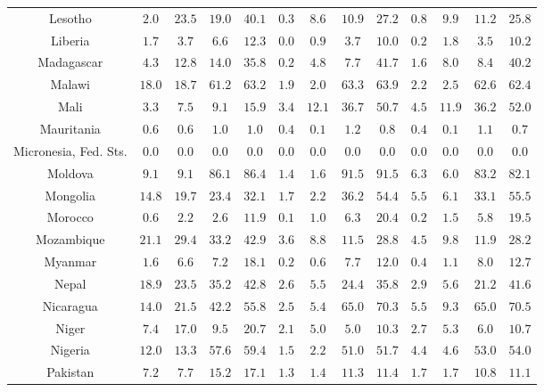 \begin{longtable}{ccccccccccccc}
Lesotho & $2.0$ & $23.5$ & $19.0$ & $40.1$ & $0.3$ & $8.6$ & $10.9$ & $27.2$ & $0.8$ & $9.9$ & $11.2$ & $25.8$ \\ 
Liberia & $1.7$ & $3.7$ & $6.6$ & $12.3$ & $0.0$ & $0.9$ & $3.7$ & $10.0$ & $0.2$ & $1.8$ & $3.5$ & $10.2$ \\ 
Madagascar & $4.3$ & $12.8$ & $14.0$ & $35.8$ & $0.2$ & $4.8$ & $7.7$ & $41.7$ & $1.6$ & $8.0$ & $8.4$ & $40.2$ \\ 
Malawi & $18.0$ & $18.7$ & $61.2$ & $63.2$ & $1.9$ & $2.0$ & $63.3$ & $63.9$ & $2.2$ & $2.5$ & $62.6$ & $62.4$ \\ 
Mali & $3.3$ & $7.5$ & $9.1$ & $15.9$ & $3.4$ & $12.1$ & $36.7$ & $50.7$ & $4.5$ & $11.9$ & $36.2$ & $52.0$ \\ 
Mauritania & $0.6$ & $0.6$ & $1.0$ & $1.0$ & $0.4$ & $0.1$ & $1.2$ & $0.8$ & $0.4$ & $0.1$ & $1.1$ & $0.7$ \\ 
Micronesia, Fed. Sts. & $0.0$ & $0.0$ & $0.0$ & $0.0$ & $0.0$ & $0.0$ & $0.0$ & $0.0$ & $0.0$ & $0.0$ & $0.0$ & $0.0$ \\ 
Moldova & $9.1$ & $9.1$ & $86.1$ & $86.4$ & $1.4$ & $1.6$ & $91.5$ & $91.5$ & $6.3$ & $6.0$ & $83.2$ & $82.1$ \\ 
Mongolia & $14.8$ & $19.7$ & $23.4$ & $32.1$ & $1.7$ & $2.2$ & $36.2$ & $54.4$ & $5.5$ & $6.1$ & $33.1$ & $55.5$ \\ 
Morocco & $0.6$ & $2.2$ & $2.6$ & $11.9$ & $0.1$ & $1.0$ & $6.3$ & $20.4$ & $0.2$ & $1.5$ & $5.8$ & $19.5$ \\ 
Mozambique & $21.1$ & $29.4$ & $33.2$ & $42.9$ & $3.6$ & $8.8$ & $11.5$ & $28.8$ & $4.5$ & $9.8$ & $11.9$ & $28.2$ \\ 
Myanmar & $1.6$ & $6.6$ & $7.2$ & $18.1$ & $0.2$ & $0.6$ & $7.7$ & $12.0$ & $0.4$ & $1.1$ & $8.0$ & $12.7$ \\ 
Nepal & $18.9$ & $23.5$ & $35.2$ & $42.8$ & $2.6$ & $5.5$ & $24.4$ & $35.8$ & $2.9$ & $5.6$ & $21.2$ & $41.6$ \\ 
Nicaragua & $14.0$ & $21.5$ & $42.2$ & $55.8$ & $2.5$ & $5.4$ & $65.0$ & $70.3$ & $5.5$ & $9.3$ & $65.0$ & $70.5$ \\ 
Niger & $7.4$ & $17.0$ & $9.5$ & $20.7$ & $2.1$ & $5.0$ & $5.0$ & $10.3$ & $2.7$ & $5.3$ & $6.0$ & $10.7$ \\ 
Nigeria & $12.0$ & $13.3$ & $57.6$ & $59.4$ & $1.5$ & $2.2$ & $51.0$ & $51.7$ & $4.4$ & $4.6$ & $53.0$ & $54.0$ \\ 
Pakistan & $7.2$ & $7.7$ & $15.2$ & $17.1$ & $1.3$ & $1.4$ & $11.3$ & $11.4$ & $1.7$ & $1.7$ & $10.8$ & $11.1$ \\ 

\end{longtable}
